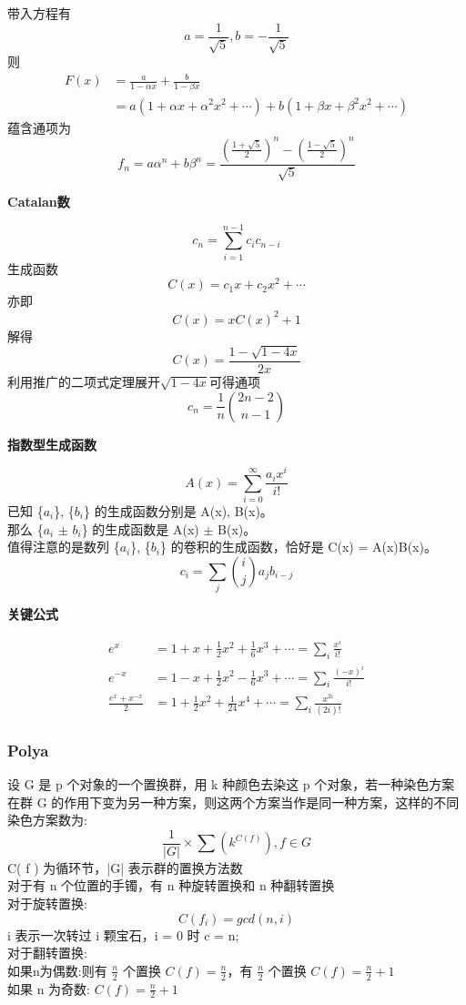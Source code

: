\documentclass[10pt]{ctexart}
\begin{document}
{{$$$$
带入方程有
$$
a = \frac{1}{\sqrt5}, b = -\frac{1}{\sqrt5}
$$
则
$$
\begin{aligned}
F(x) &= \frac{a}{1-\alpha x} + \frac{b}{1-\beta x}\\
&= a(1+\alpha x + \alpha^2x^2+\cdots) + b(1+\beta x + \beta^2x^2+\cdots)
\end{aligned}
$$
蕴含通项为
$$
f_n = a\alpha^n + b\beta^n = \frac{(\frac{1+\sqrt5}{2})^n - (\frac{1-\sqrt5}{2})^n}{\sqrt5}
$$
{\large\bfseries Catalan数\par}
$$
c_n = \sum_{i=1}^{n-1} c_ic_{n-i}
$$
生成函数
$$
C(x) = c_1x+c_2x^2+\cdots
$$
亦即
$$
C(x) = xC(x)^2 + 1
$$
解得
$$
C(x) = \frac{1 - \sqrt{1-4x}}{2x}
$$
利用推广的二项式定理展开$\sqrt{1-4x}$可得通项
$$
c_n = \frac1n \binom{2n-2}{n-1}
$$
{\Large\bfseries 指数型生成函数\par}
$$
A(x) = \sum_{i=0}^{\infty} \frac{a_ix^i}{i!}
$$
已知 \{$a_i$\}, \{$b_i$\} 的生成函数分别是 A(x), B(x)。\\
那么 \{$a_i$ $\pm$ $b_i$\} 的生成函数是 A(x) $\pm$ B(x)。 \\
值得注意的是数列 \{$a_i$\}, \{$b_i$\} 的卷积的生成函数，恰好是 C(x) = A(x)B(x)。\\
$$
c_i = \sum_j \binom{i}{j} a_jb_{i-j}
$$
{\large\bfseries 关键公式\par}
\begin{equation*}
\begin{aligned}
e^x &= 1 + x + \frac12x^2 + \frac16x^3+\cdots = \sum_i \frac{x^i}{i!}\\
e^{-x} &= 1 - x + \frac12x^2 - \frac16x^3+\cdots = \sum_i \frac{(-x)^i}{i!}\\
\frac{e^x + x^{-x}}{2} &= 1+\frac12x^2+\frac1{24}x^4+\cdots = \sum_i \frac{x^{2i}}{(2i)!}
\end{aligned}
\end{equation*}
\subsubsection{Polya}
设 G 是 p 个对象的一个置换群，用 k 种颜色去染这 p 个对象，若一种染色方案在群 G 的作用下变为另一种方案，则这两个方案当作是同一种方案，这样的不同染色方案数为:\\
$$
\frac{1}{|G|} \times \sum(k^{C(f)}), f \in G
$$
C( f ) 为循环节，|G| 表示群的置换方法数\\
对于有 n 个位置的手镯，有 n 种旋转置换和 n 种翻转置换\\
对于旋转置换:\\
$$
C(f_i) = gcd(n, i)
$$
i 表示一次转过 i 颗宝石，i = 0 时 c = n;\\
对于翻转置换:\\
如果n为偶数:则有 $\frac n2$ 个置换 $C(f)=\frac n2$，有 $\frac n2$ 个置换 $C(f)=\frac n2 +1$\\
如果 n 为奇数: $C(f) = \frac n2 + 1$\\
}}
\end{document}
